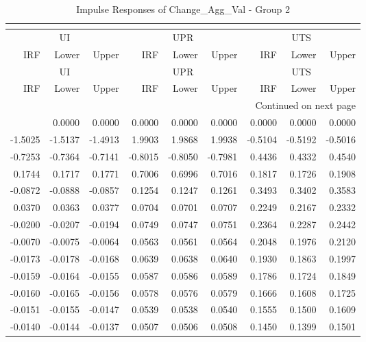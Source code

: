 \begin{longtable}{rrrrrrrrr}
\caption{Impulse Responses of Change_Agg_Val - Group 2}\\
\label{tab:cav_irf_group2}\\
\toprule
\multicolumn{3}{c}{UI} & \multicolumn{3}{c}{UPR} & \multicolumn{3}{c}{UTS} \\
IRF & Lower & Upper & IRF & Lower & Upper & IRF & Lower & Upper \\
\midrule
\endfirsthead
\toprule
\multicolumn{3}{c}{UI} & \multicolumn{3}{c}{UPR} & \multicolumn{3}{c}{UTS} \\
IRF & Lower & Upper & IRF & Lower & Upper & IRF & Lower & Upper \\
\midrule
\endhead
\midrule
\multicolumn{9}{r}{Continued on next page} \\
\midrule
\endfoot
\bottomrule
\endlastfoot
0.0000 & 0.0000 & 0.0000 & 0.0000 & 0.0000 & 0.0000 & 0.0000 & 0.0000 & 0.0000 \\
-1.5025 & -1.5137 & -1.4913 & 1.9903 & 1.9868 & 1.9938 & -0.5104 & -0.5192 & -0.5016 \\
-0.7253 & -0.7364 & -0.7141 & -0.8015 & -0.8050 & -0.7981 & 0.4436 & 0.4332 & 0.4540 \\
0.1744 & 0.1717 & 0.1771 & 0.7006 & 0.6996 & 0.7016 & 0.1817 & 0.1726 & 0.1908 \\
-0.0872 & -0.0888 & -0.0857 & 0.1254 & 0.1247 & 0.1261 & 0.3493 & 0.3402 & 0.3583 \\
0.0370 & 0.0363 & 0.0377 & 0.0704 & 0.0701 & 0.0707 & 0.2249 & 0.2167 & 0.2332 \\
-0.0200 & -0.0207 & -0.0194 & 0.0749 & 0.0747 & 0.0751 & 0.2364 & 0.2287 & 0.2442 \\
-0.0070 & -0.0075 & -0.0064 & 0.0563 & 0.0561 & 0.0564 & 0.2048 & 0.1976 & 0.2120 \\
-0.0173 & -0.0178 & -0.0168 & 0.0639 & 0.0638 & 0.0640 & 0.1930 & 0.1863 & 0.1997 \\
-0.0159 & -0.0164 & -0.0155 & 0.0587 & 0.0586 & 0.0589 & 0.1786 & 0.1724 & 0.1849 \\
-0.0160 & -0.0165 & -0.0156 & 0.0578 & 0.0576 & 0.0579 & 0.1666 & 0.1608 & 0.1725 \\
-0.0151 & -0.0155 & -0.0147 & 0.0539 & 0.0538 & 0.0540 & 0.1555 & 0.1500 & 0.1609 \\
-0.0140 & -0.0144 & -0.0137 & 0.0507 & 0.0506 & 0.0508 & 0.1450 & 0.1399 & 0.1501 \\
\end{longtable}